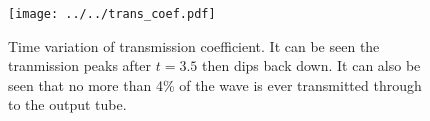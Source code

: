 \documentclass[../../main.tex]{subfiles}
\begin{document}
\begin{figure}[h]
		\centering
		\texttt{[image: ../../trans\_coef.pdf]}
		\caption{Time variation of transmission coefficient.  
				It can be seen the tranmission peaks after 
				$t = 3.5$ then dips back down.  
				It can also be seen that no more than 4\% of the wave 
				is ever transmitted through to the output tube.
		}
		\label{fig:trans-coef}
\end{figure}
\end{document}
